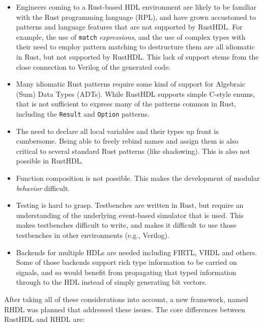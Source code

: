 \documentclass[conference]{IEEEtran}
\begin{document}
\begin{itemize}
  \item Engineers coming to a Rust-based HDL environment are likely to be familiar with the Rust programming language (RPL),
  and have grown accustomed to patterns and language features that are not supported by RustHDL.  For example, the 
  use of \verb|match| \emph{expressions}, and the use of complex types with their need to employ pattern matching to destructure 
  them are all idiomatic in Rust, but not supported by RustHDL.  This lack of support stems from the close 
  connection to Verilog of the generated code.
  \item Many idiomatic Rust patterns require some kind of support for Algebraic (Sum) Data Types (ADTs).  While RustHDL
  supports simple C-style enums, that is not sufficient to express many of the patterns common in Rust, including the 
  \verb|Result| and \verb|Option| patterns.
  \item The need to declare all local variables and their types up front is cumbersome.  Being able to freely rebind
  names and assign them is also critical to several standard Rust patterns (like shadowing).  This is also not
  possible in RustHDL.
  \item Function composition is not possible.  This makes the development of modular \emph{behavior} difficult.
  \item Testing is hard to grasp.  Testbenches are written in Rust, but require an understanding of the underlying
  event-based simulator that is used.  This makes testbenches difficult to write, and makes it difficult to use those
  testbenches in other environments (e.g., Verilog).
  \item Backends for multiple HDLs are needed including FIRTL, VHDL and others.  Some of those backends support
  rich type information to be carried on signals, and so would benefit from propagating that typed information through
  to the HDL instead of simply generating bit vectors.
\end{itemize}

After taking all of these considerations into account, a new framework, named RHDL was planned that addressed these issues.  The 
core differences between RustHDL and RHDL are:
\end{document}
